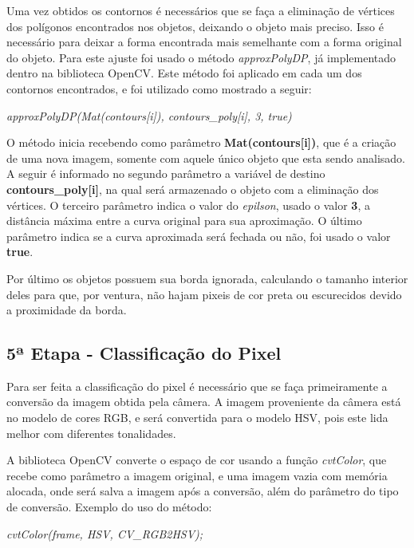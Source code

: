 Uma vez obtidos os contornos é necessários que se faça a eliminação de vértices dos polígonos encontrados nos objetos, deixando o objeto mais preciso. Isso é necessário para deixar a forma encontrada mais semelhante com a forma original do objeto. Para este ajuste foi usado o método \textit{approxPolyDP}, já implementado dentro na biblioteca OpenCV. Este método foi aplicado em cada um dos contornos encontrados, e foi utilizado como mostrado a seguir:
\begin{center}
\centering \textit{    approxPolyDP(Mat(contours[i]), contours\_poly[i], 3, true)}
\end{center}

O método inicia recebendo como parâmetro \textbf{Mat(contours[i])}, que é a criação de uma nova imagem, somente com aquele único objeto que esta sendo analisado. A seguir é informado no segundo parâmetro a variável de destino \textbf{contours\_poly[i]}, na qual será armazenado o objeto com a eliminação dos vértices. O terceiro parâmetro indica o valor do \textit{epilson}, usado o valor \textbf{3}, a distância máxima entre a curva original para sua aproximação\cite{OpenCV}. O último parâmetro indica se a curva aproximada será fechada ou não, foi usado o valor \textbf{true}.

Por último os objetos possuem sua borda ignorada, calculando o tamanho interior deles para que, por ventura, não hajam pixeis de cor preta ou escurecidos devido a proximidade da borda.
 
 \subsection{5ª Etapa - Classificação do Pixel}

 
 
 Para ser feita a classificação do pixel é necessário que se faça primeiramente a conversão da imagem obtida pela câmera. A imagem proveniente da câmera está no modelo de cores RGB, e será convertida para o modelo HSV, pois este lida melhor com diferentes tonalidades.
  
 A biblioteca OpenCV converte o espaço de cor usando a função \textit{cvtColor}, que recebe como parâmetro a imagem original, e uma imagem vazia com memória alocada, onde será salva a imagem após a conversão, além do parâmetro do tipo de conversão. Exemplo do uso do método:
\begin{center}
\centering \textit{cvtColor(frame, HSV, CV\_RGB2HSV);}
\end{center}

